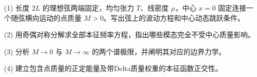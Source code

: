 (1) 长度 \(2L\) 的理想弦两端固定，均匀张力 \(T\)、线密度 \(\mu\)，中心 \(x=0\) 固定连接一个随弦横向运动的点质量 \(M>0\)。写出弦上的波动方程和中心动态跳跃条件。

(2) 用奇偶对称分解求全部本征频率方程，指出哪些模态完全不受中心质量影响。

(3) 分析 \(M\to0\) 与 \(M\to\infty\) 的两个谱极限，并阐明其对应的边界力学。

(4) 建立包含点质量的正定能量及带Delta质量权重的本征函数正交性。
